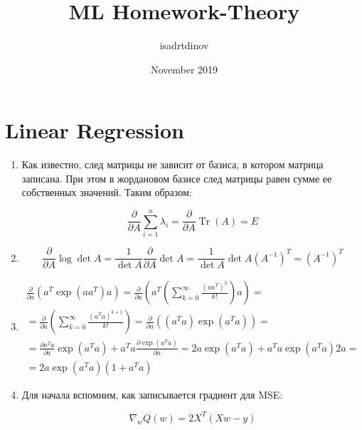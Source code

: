 \documentclass{article}
\title{ML Homework-Theory}
\author{isadrtdinov}
\date{November 2019}
\DeclareMathOperator{\Tr}{Tr}
\begin{document}
\maketitle

\section{Linear Regression}

\begin{enumerate}
    \item Как известно, след матрицы не зависит от базиса, в котором матрица записана. При этом в жордановом базисе след матрицы равен сумме ее собственных значений. Таким образом:
    
    \small
    \begin{equation*}
        \frac{\partial}{\partial A} \sum_{i=1}^n \lambda_i = \frac{\partial}{\partial A} \Tr(A) = E
    \end{equation*}
    \normalsize

    \item
    \small
    \begin{equation*}
        \frac{\partial}{\partial A} \log \det A = \frac{1}{\det A} \frac{\partial}{\partial A} \det A = \frac{1}{\det A} \det A {(A^{-1})}^T = {(A^{-1})}^T
    \end{equation*}
    \normalsize

    \item
    \small
    \begin{gather*}
        \frac{\partial}{\partial a} \left(a^T \exp(a a^T)a \right) =
        \frac{\partial}{\partial a} \left( a^T \left( \sum_{k=0}^{\infty} \frac{{(a a^T)}^k}{k!} \right) a\right) = \\
        = \frac{\partial}{\partial a} \left( \sum_{k=0}^{\infty} \frac{{(a^T a)}^{k + 1}}{k!} \right) = 
        \frac{\partial}{\partial a} \left( (a^T a) \exp(a^T a) \right) = \\
        = \frac{\partial a^T a}{\partial a} \exp(a^T a) + a^T a \frac{\partial \exp(a^T a)}{\partial a} = 
        2a \exp(a^T a) + a^T a \exp(a^T a) 2a = \\
        = 2a \exp(a^T a) (1 + a^T a)
    \end{gather*}
    \normalsize

    \item Для начала вспомним, как записывается градиент для MSE:

    \small
    \begin{equation*}
        \nabla_w Q(w) = 2X^T (X w - y)
    \end{equation*}{}
    \normalsize


\end{enumerate}
\end{document}
